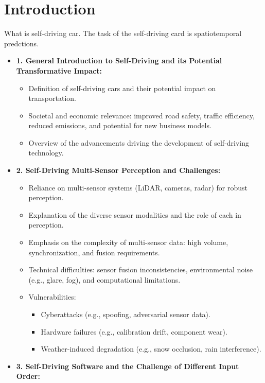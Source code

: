 \section{Introduction} \label{Introduction}

What is self-driving car. The task of the self-driving card is spatiotemporal predctions.

\begin{itemize}
    \item \textbf{1. General Introduction to Self-Driving and its Potential Transformative Impact:}
    \begin{itemize}
        \item Definition of self-driving cars and their potential impact on transportation.
        \item Societal and economic relevance: improved road safety, traffic efficiency, reduced emissions, and potential for new business models.
        \item Overview of the advancements driving the development of self-driving technology.
    \end{itemize}
    \item \textbf{2. Self-Driving Multi-Sensor Perception and Challenges:}
    \begin{itemize}
        \item Reliance on multi-sensor systems (LiDAR, cameras, radar) for robust perception.
        \item Explanation of the diverse sensor modalities and the role of each in perception.
        \item Emphasis on the complexity of multi-sensor data: high volume, synchronization, and fusion requirements.
        \item Technical difficulties: sensor fusion inconsistencies, environmental noise (e.g., glare, fog), and computational limitations.
        \item Vulnerabilities:
        \begin{itemize}
            \item Cyberattacks (e.g., spoofing, adversarial sensor data).
            \item Hardware failures (e.g., calibration drift, component wear).
            \item Weather-induced degradation (e.g., snow occlusion, rain interference).
        \end{itemize}
    \end{itemize}
    \item \textbf{3. Self-Driving Software and the Challenge of Different Input Order:}

\end{itemize}

